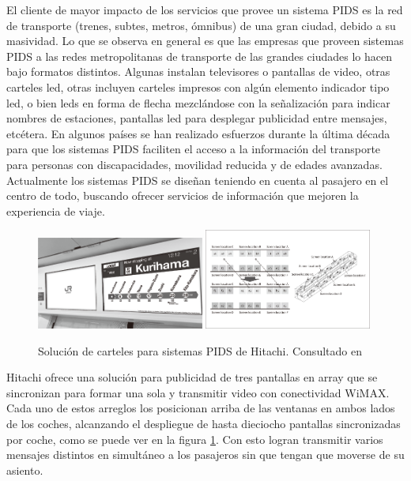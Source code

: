El cliente de mayor impacto de los servicios que provee un sistema PIDS es la red de transporte (trenes, subtes, metros, ómnibus) de una gran ciudad, debido a su masividad. Lo que se observa en general es que las empresas que proveen sistemas PIDS a las redes metropolitanas de transporte de las grandes ciudades lo hacen bajo formatos distintos. Algunas instalan televisores o pantallas de video, otras carteles led, otras incluyen carteles impresos con algún elemento indicador tipo led, o bien leds en forma de flecha mezclándose con la señalización para indicar nombres de estaciones, pantallas led para desplegar publicidad entre mensajes, etcétera. En algunos países se han realizado esfuerzos durante la última década para que los sistemas PIDS faciliten el acceso a la información del transporte para personas con discapacidades, movilidad reducida y de edades avanzadas. Actualmente los sistemas PIDS se diseñan teniendo en cuenta al pasajero en el centro de todo, buscando ofrecer servicios de información que mejoren la experiencia de viaje.\\

\begin{figure}[h!]
	\centering
	\includegraphics[width=0.49\textwidth]{./Figures/HitachiCartelPIDS.png}
	\includegraphics[width=0.49\textwidth]{./Figures/HitachiDisplayArray.png}
	\caption{Solución de carteles para sistemas PIDS de Hitachi. Consultado en \citep{Hitachi}}
	\label{fig:Hitachi}
\end{figure}

Hitachi ofrece una solución para publicidad de tres pantallas en array que se sincronizan para formar una sola y transmitir video con conectividad WiMAX. Cada uno de estos arreglos los posicionan arriba de las ventanas en ambos lados de los coches, alcanzando el despliegue de hasta dieciocho pantallas sincronizadas por coche, como se puede ver en la figura \ref{fig:Hitachi}. Con esto logran transmitir varios mensajes distintos en simultáneo a los pasajeros sin que tengan que moverse de su asiento.\\


